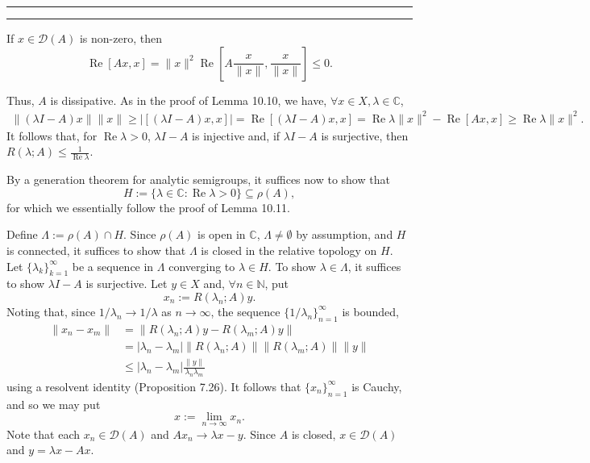 \documentclass[11pt]{article}
\newcounter{questionCounter}
\newcounter{partCounter}[questionCounter]
\newenvironment{question}[2][\arabic{questionCounter}]{%
    \setcounter{partCounter}{0}%
    \vspace{.25in} \hrule \vspace{0.5em}%
        \noindent{\bf #2}%
    \vspace{0.8em} \hrule \vspace{.10in}%
    \addtocounter{questionCounter}{1}%
}{}
\newcommand{\N}{\mathbb{N}}             %
\newcommand{\C}{\mathbb{C}}             %
\newcommand{\D}{\mathcal{D}}            %
\renewcommand{\Re}{\operatorname{Re}}   %
\begin{document}
\begin{question}{Problem 4}
If $x \in \D(A)$ is non-zero, then
\[
\Re [Ax,x]
    = \|x\|^2 \Re \left[ A\frac{x}{\|x\|}, \frac{x}{\|x\|} \right]
    \leq 0.
\]

Thus, $A$ is dissipative. As in the proof of Lemma 10.10, we have,
$\forall x \in X, \lambda \in \C$,
\begin{align*}
\|(\lambda I - A)x\| \|x\|
    \geq |[(\lambda I - A)x,x]|
    = \Re[(\lambda I - A)x,x]
    = \Re \lambda \|x\|^2 - \Re [Ax,x]
    \geq \Re \lambda \|x\|^2.
\end{align*}
It follows that, for $\Re \lambda > 0$, $\lambda I - A$ is
injective and, if $\lambda I - A$ is surjective, then
$R(\lambda;A) \leq \frac{1}{\Re \lambda}$.

By a generation theorem for analytic semigroups, it suffices now to show that
\[H := \{\lambda \in \C : \Re \lambda > 0\} \subseteq \rho(A),\]
for which we essentially follow the proof of Lemma 10.11.

Define $\Lambda := \rho(A) \cap H$. Since
$\rho(A)$ is open in $\C$, $\Lambda \neq \emptyset$ by assumption, and $H$ is
connected, it suffices to show that $\Lambda$ is closed in the relative
topology on $H$. Let $\{\lambda_k\}_{k = 1}^\infty$ be a sequence in $\Lambda$
converging to $\lambda \in H$. To show $\lambda \in \Lambda$, it suffices to
show $\lambda I - A$ is surjective. Let $y \in X$ and, $\forall n \in \N$, put
\[x_n := R(\lambda_n; A)y.\]
Noting that, since $1/\lambda_n \to 1/\lambda$ as $n \to \infty$, the sequence
$\{1/\lambda_n\}_{n = 1}^\infty$ is bounded,
\begin{align*}
\|x_n - x_m\|
 &  = \|R(\lambda_n;A)y - R(\lambda_m;A)y\| \\
 &  = |\lambda_n - \lambda_m|\|R(\lambda_n;A)\|\|R(\lambda_m;A)\|\|y\|  \\
 &  \leq |\lambda_n - \lambda_m|\frac{\|y\|}{\lambda_n\lambda_m}
\end{align*}
using a resolvent identity (Proposition 7.26). It follows that
$\{x_n\}_{n = 1}^\infty$ is Cauchy, and so we may put
\[x := \lim_{n \to \infty} x_n.\]
Note that each $x_n \in \D(A)$ and $Ax_n \to \lambda x - y$. Since $A$ is
closed, $x \in \D(A)$ and $y = \lambda x - Ax$.
\end{question}
\end{document}

